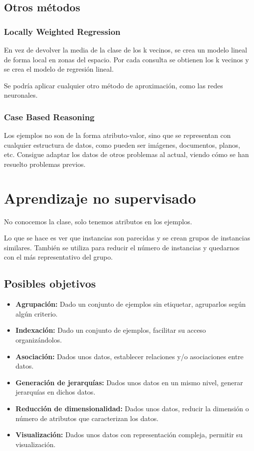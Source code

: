 \documentclass[12pt, twoside, openright]{report} %
\begin{document}
\subsection{Otros métodos}
\subsubsection{Locally Weighted Regression}
En vez de devolver la media de la clase de los k vecinos, se crea un modelo lineal de forma local en zonas del espacio. Por cada consulta se obtienen los k vecinos y se crea el modelo de regresión lineal.

Se podría aplicar cualquier otro método de aproximación, como las redes neuronales.
\subsubsection{Case Based Reasoning}
Los ejemplos no son de la forma atributo-valor, sino que se representan con cualquier estructura de datos, como pueden ser imágenes, documentos, planos, etc. Consigue adaptar los datos de otros problemas al actual, viendo cómo se han resuelto problemas previos.

\section{Aprendizaje no supervisado}
No conocemos la clase, solo tenemos atributos en los ejemplos.

Lo que se hace es ver que instancias son parecidas y se crean grupos de instancias similares. También se utiliza para reducir el número de instancias y quedarnos con el más representativo del grupo.

\subsection{Posibles objetivos}
\begin{itemize}
  \item \textbf{Agrupación:} Dado un conjunto de ejemplos sin etiquetar, agruparlos según algún criterio.
  \item \textbf{Indexación:} Dado un conjunto de ejemplos, facilitar su acceso organizándolos.
  \item \textbf{Asociación:} Dados unos datos, establecer relaciones y/o asociaciones entre datos.
  \item \textbf{Generación de jerarquías:} Dados unos datos en un mismo nivel, generar jerarquías en dichos datos.
  \item \textbf{Reducción de dimensionalidad:} Dados unos datos, reducir la dimensión o número de atributos que caracterizan los datos.
  \item \textbf{Visualización:} Dados unos datos con representación compleja, permitir su visualización.
\end{itemize}
\end{document}
